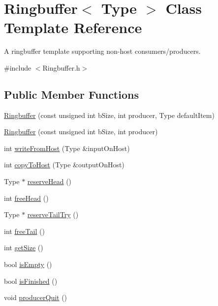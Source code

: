 \hypertarget{classRingbuffer}{\section{Ringbuffer$<$ Type $>$ Class Template Reference}
\label{classRingbuffer}
}


A ringbuffer template supporting non-\/host consumers/producers.  




{\ttfamily \#include $<$Ringbuffer.\-h$>$}

\subsection*{Public Member Functions}
\begin{DoxyCompactItemize}
\item 
\hyperlink{classRingbuffer_a8982c4a8217131d5183e0f8562978ca4}{Ringbuffer} (const unsigned int b\-Size, int producer, Type default\-Item)
\item 
\hyperlink{classRingbuffer_ad8b9e2d524a89f22e7feffac888af796}{Ringbuffer} (const unsigned int b\-Size, int producer)
\item 
int \hyperlink{classRingbuffer_a6ad11ee3df86729dd6a2b567eabb9e0c}{write\-From\-Host} (Type \&input\-On\-Host)
\item 
int \hyperlink{classRingbuffer_a3795dfe25eca748e9bec6adf7e2658d2}{copy\-To\-Host} (Type \&output\-On\-Host)
\item 
Type $\ast$ \hyperlink{classRingbuffer_acf64a0c3c16f208dd1191130b0d18b33}{reserve\-Head} ()
\item 
int \hyperlink{classRingbuffer_a1d8b62be3d51a00930e7b06d1ad2df53}{free\-Head} ()
\item 
Type $\ast$ \hyperlink{classRingbuffer_ab8a0b4877bfcf06687d782b029185be7}{reserve\-Tail\-Try} ()
\item 
int \hyperlink{classRingbuffer_a66193754bca336ed8b8f2d5a9a89995c}{free\-Tail} ()
\item 
int \hyperlink{classRingbuffer_aefca234ed766de811794f6ab91e86d17}{get\-Size} ()
\item 
bool \hyperlink{classRingbuffer_af746d95cfff3115957d01181484be191}{is\-Empty} ()
\item 
bool \hyperlink{classRingbuffer_ac43a1bbfa6c41dd0aba33c70248425a6}{is\-Finished} ()
\item 
void \hyperlink{classRingbuffer_ae40e43d8729f0cfdcb97675cda52b05f}{producer\-Quit} ()
\end{DoxyCompactItemize}



